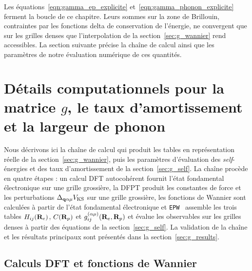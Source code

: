 Les équations~\eqref{eqn:gamma_ep_explicite} et~\eqref{eqn:gamma_phonon_explicite} ferment la boucle de ce chapitre. Leurs sommes sur la zone de Brillouin, contraintes par les fonctions delta de conservation de l'énergie, ne convergent que sur les grilles denses que l'interpolation de la section~\ref{sec:g_wannier} rend accessibles. La section suivante précise la chaîne de calcul ainsi que les paramètres de notre évaluation numérique de ces quantités.

\section{Détails computationnels pour la matrice $g$, le taux d'amortissement et la largeur de phonon}\label{sec:g_détails}

Nous décrivons ici la chaîne de calcul qui produit les tables en représentation réelle de la section~\ref{sec:g_wannier}, puis les paramètres d'évaluation des \textit{self}-énergies et des taux d'amortissement de la section~\ref{sec:g_self}. La chaîne procède en quatre étapes : un calcul DFT autocohérent fournit l'état fondamental électronique sur une grille grossière, la DFPT produit les constantes de force et les perturbations $\Delta_{\mathbf{q}\alpha\mu}V_\text{KS}$ sur une grille grossière, les fonctions de Wannier sont calculées à partir de l'état fondamental électronique et \texttt{EPW}~\cite{ponceEPWElectronphononCoupling2016,leeElectronPhononPhysics2023a} assemble les trois tables $H_{ij}(\mathbf{R}_e)$, $C(\mathbf{R}_p)$ et $g_{ij}^{(\alpha\mu)}(\mathbf{R}_e,\mathbf{R}_p)$ et évalue les observables sur les grilles denses à partir des équations de la section~\ref{sec:g_self}. La validation de la chaîne et les résultats principaux sont présentés dans la section~\ref{sec:g_results}.

\subsection{Calculs DFT et fonctions de Wannier}

